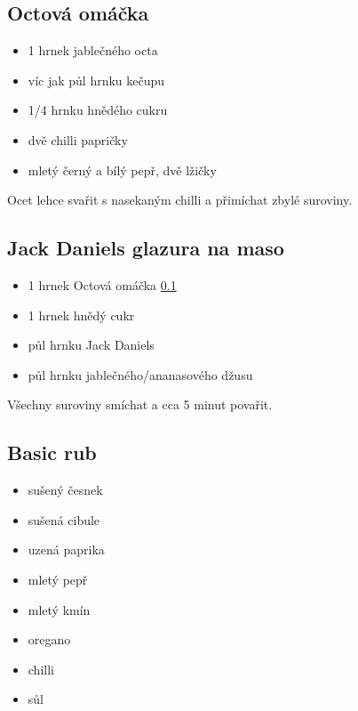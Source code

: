 \documentclass[10pt,a4paper]{article}
\newenvironment{myitemize}
{ \begin{itemize}
    \setlength{\itemsep}{0pt}
    \setlength{\parskip}{0pt}
    \setlength{\parsep}{0pt}     }
{ \end{itemize}                  }
\begin{document}
\subsection{Octová omáčka}
\label{fig:octovaOmacka}
\begin{minipage}[t]{0,5\textwidth}
\begin{myitemize} 
\item 1 hrnek jablečného octa
\item víc jak půl hrnku kečupu
\item 1/4 hrnku hnědého cukru
\item dvě chilli papričky
\item mletý černý a bílý pepř, dvě lžičky
\end{myitemize}
\end{minipage}
\begin{minipage}[t]{0,5\textwidth}
Ocet lehce svařit s nasekaným chilli a přimíchat zbylé suroviny.
\end{minipage}
\subsection{Jack Daniels glazura na maso}
\label{fig:JDglazura}
\begin{minipage}[t]{0,5\textwidth}
\begin{myitemize} 
\item 1 hrnek Octová omáčka \ref{fig:octovaOmacka}
\item 1 hrnek hnědý cukr
\item půl hrnku Jack Daniels
\item půl hrnku jablečného/ananasového džusu
\end{myitemize}
\end{minipage}
\begin{minipage}[t]{0,5\textwidth}
Všechny suroviny smíchat a cca 5 minut povařit.
\end{minipage}

\subsection{Basic rub}\label{fig:basicRub}
\begin{minipage}[t]{0,5\textwidth}
\begin{myitemize} 
\item sušený česnek
\item sušená cibule
\item uzená paprika
\item mletý pepř
\item mletý kmín
\item oregano
\item chilli
\item sůl
\end{myitemize}
\end{minipage}
\begin{minipage}[t]{0,5\textwidth}

\end{minipage}
\pagebreak
\end{document}
